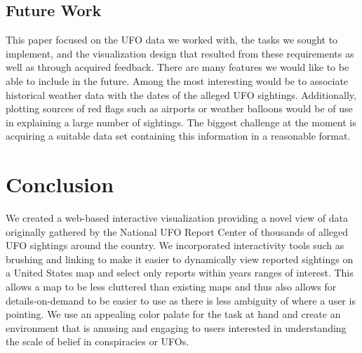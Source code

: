 \documentclass[journal]{vgtc}                %
\begin{document}
\subsection{Future Work}
This paper focused on the UFO data we worked with, the tasks we sought to implement, and the visualization design that resulted from these requirements as well as through acquired feedback. There are many features we would like to be able to include in the future. Among the most interesting would be to associate historical weather data with the dates of the alleged UFO sightings. Additionally, plotting sources of red flags such as airports or weather balloons would be of use in explaining a large number of sightings. The biggest challenge at the moment is acquiring a suitable data set containing this information in a reasonable format. 


\section{Conclusion}
We created a web-based interactive visualization providing a novel view of data originally gathered by the National UFO Report Center of thousands of alleged UFO sightings around the country. We incorporated interactivity tools such as brushing and linking to make it easier to dynamically view reported sightings on a United States map and select only reports within years ranges of interest. This allows a map to be less cluttered than existing maps and thus also allows for details-on-demand to be easier to use as there is less ambiguity of where a user is pointing. We use an appealing color palate for the task at hand and create an environment that is amusing and engaging to users interested in understanding the scale of belief in conspiracies or UFOs.
\end{document}
